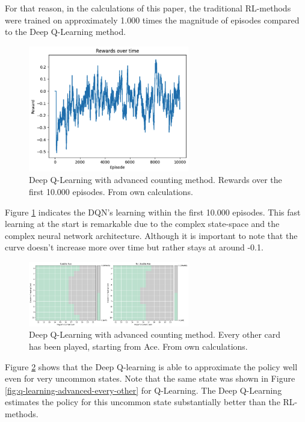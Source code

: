 \documentclass[conference]{IEEEtran}
\begin{document}
For that reason, in the calculations of this paper, the traditional RL-methods were trained on approximately 1.000 times the magnitude of episodes compared to the Deep Q-Learning method.

\begin{figure}
	\centering
	\includegraphics[width=70mm]{figures/DQN/rewards_over_time_10000.png}
	\caption{Deep Q-Learning with advanced counting method. Rewards over the first 10.000 episodes. From own calculations.}
	\label{fig:dqn-rewards-over-time}
\end{figure}

Figure \ref{fig:dqn-rewards-over-time} indicates the DQN's learning within the first 10.000 episodes. 
This fast learning at the start is remarkable due to the complex state-space and the complex neural network architecture. 
Although it is important to note that the curve doesn't increase more over time but rather stays at around -0.1. 

\begin{figure}
	\centering
	\includegraphics[width=70mm]{figures/DQN/advanced/policy-1010101010.png}
	\caption{Deep Q-Learning with advanced counting method. Every other card has been played, starting from Ace. From own calculations.}
	\label{fig:dqn-advanced-every-other}
\end{figure}

Figure \ref{fig:dqn-advanced-every-other} shows that the Deep Q-learning is able to approximate the policy well even for very uncommon states. 
Note that the same state was shown in Figure \ref{fig:q-learning-advanced-every-other} for Q-Learning. 
The Deep Q-Learning estimates the policy for this uncommon state substantially better than the RL-methods. 
\end{document}
